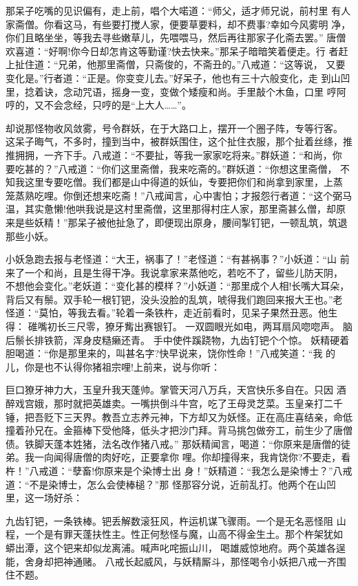那呆子吃嘴的见识偏有，走上前，唱个大喏道：“师父，适才师兄说，前村里
有人家斋僧。你看这马，有些要打搅人家，便要草要料，却不费事?幸如今风雾明
净，你们且略坐坐，等我去寻些嫩草儿，先喂喂马，然后再往那家子化斋去罢。”
唐僧欢喜道：“好啊!你今日却怎肯这等勤谨?快去快来。”那呆子暗暗笑着便走。行
者赶上扯住道：“兄弟，他那里斋僧，只斋俊的，不斋丑的。”八戒道：“这等说，
又要变化是。”行者道：“正是。你变变儿去。”好呆子，他也有三十六般变化，走
到山凹里，捻着诀，念动咒语，摇身一变，变做个矮瘦和尚。手里敲个木鱼，口里
哼阿哼的，又不会念经，只哼的是“上大人……”。

却说那怪物收风敛雾，号令群妖，在于大路口上，摆开一个圈子阵，专等行客。
这呆子晦气，不多时，撞到当中，被群妖围住，这个扯住衣服，那个扯着丝绦，推
推拥拥，一齐下手。八戒道：“不要扯，等我一家家吃将来。”群妖道：“和尚，你
要吃甚的？”八戒道：“你们这里斋僧，我来吃斋的。”群妖道：“你想这里斋僧，
不知我这里专要吃僧。我们都是山中得道的妖仙，专要把你们和尚拿到家里，上蒸
笼蒸熟吃哩。你倒还想来吃斋！”八戒闻言，心中害怕；才报怨行者道：“这个弼马
温，其实惫懒!他哄我说是这村里斋僧，这里那得村庄人家，那里斋甚么僧，却原
来是些妖精！”那呆子被他扯急了，即便现出原身，腰间掣钉钯，一顿乱筑，筑退
那些小妖。

小妖急跑去报与老怪道：“大王，祸事了！”老怪道：“有甚祸事？”小妖道：“山
前来了一个和尚，且是生得干净。我说拿家来蒸他吃，若吃不了，留些儿防天阴，
不想他会变化。”老妖道：“变化甚的模样？”小妖道：“那里成个人相!长嘴大耳朵，
背后又有鬃。双手轮一根钉钯，没头没脸的乱筑，唬得我们跑回来报大王也。”老
怪道：“莫怕，等我去看。”轮着一条铁杵，走近前看时，见呆子果然丑恶。他生得：
碓嘴初长三尺零，獠牙觜出赛银钉。
一双圆眼光如电，两耳扇风唿唿声。
脑后鬃长排铁箭，浑身皮糙癞还青。
手中使件蹊跷物，九齿钉钯个个惊。
妖精硬着胆喝道：“你是那里来的，叫甚名字?快早说来，饶你性命！”八戒笑道：“我
的儿，你是也不认得你猪祖宗哩!上前来，说与你听：

巨口獠牙神力大，玉皇升我天蓬帅。掌管天河八万兵，天宫快乐多自在。只因
酒醉戏宫娥，那时就把英雄卖。一嘴拱倒斗牛宫，吃了王母灵芝菜。玉皇亲打二千
锤，把吾贬下三天界。教吾立志养元神，下方却又为妖怪。正在高庄喜结亲，命低
撞着孙兄在。金箍棒下受他降，低头才把沙门拜。背马挑包做夯工，前生少了唐僧
债。铁脚天蓬本姓猪，法名改作猪八戒。”
那妖精闻言，喝道：“你原来是唐僧的徒弟。我一向闻得唐僧的肉好吃，正要拿你
哩。你却撞得来，我肯饶你?不要走，看杵！”八戒道：“孽畜!你原来是个染博士出
身！”妖精道：“我怎么是染博士？”八戒道：“不是染博士，怎么会使棒槌？”那
怪那容分说，近前乱打。他两个在山凹里，这一场好杀：

九齿钉钯，一条铁棒。钯丢解数滚狂风，杵运机谋飞骤雨。一个是无名恶怪阻
山程，一个是有罪天蓬扶性主。性正何愁怪与魔，山高不得金生土。那个杵架犹如
蟒出潭，这个钯来却似龙离浦。喊声叱咤振山川，喝雄威惊地府。两个英雄各逞
能，舍身却把神通赌。
八戒长起威风，与妖精厮斗，那怪喝令小妖把八戒一齐围住不题。

